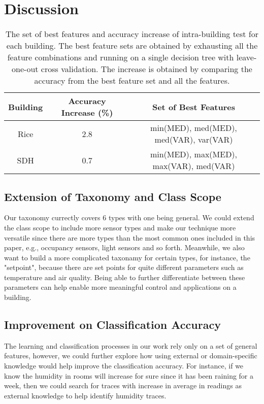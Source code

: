 \section{Discussion}
\begin{table*}
    \centering %
    \begin{tabular}{c c c}%
        \hline %
        Building & Accuracy Increase (\%) & Set of Best Features \\ %
        \hline\hline %
        Rice & 2.8 & min(MED), med(MED), med(VAR), var(VAR) \\ \hline
        SDH & 0.7 & min(MED), max(MED), max(VAR), med(VAR) \\\hline
    \end{tabular}
    \caption{The set of best features and accuracy increase of intra-building test for each building. The best feature sets are obtained by exhausting all the feature combinations and running on a single decision tree with leave-one-out cross validation. The increase is obtained by comparing the accuracy from the best feature set and all the features.}
    \label{table:feature} %
\end{table*}

\subsection{Extension of Taxonomy and Class Scope}
Our taxonomy currectly covers 6 types with one being general. We could extend the class scope to include more sensor types and make our technique more versatile since there are 
more types than the most common ones included in this paper, e.g., occupancy sensors, light sensors and so forth. Meanwhile, we also want to build a more complicated taxonamy for certain types, 
for instance, the "setpoint", because there are set points for quite different parameters such as temperature and air quality. Being able to further differentiate between these parameters can
help enable more meaningful control and applications on a building.

\subsection{Improvement on Classification Accuracy}
The learning and classification processes in our work rely only on a set of general features, however, we could further explore how using external or domain-specific knowledge 
would help improve the classification accuracy. For instance, if we know the humidity in rooms will increase for sure since it has been raining for a week, then we could search for 
traces with increase in average in readings as external knowledge to help identify humidity traces. 

